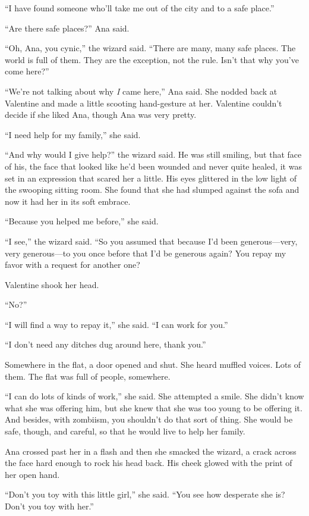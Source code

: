 “I have found someone who’ll take me out of the city and to a safe
place.”

“Are there safe places?” Ana said.

“Oh, Ana, you cynic,” the wizard said. “There are many, many safe
places. The world is full of them. They are the exception, not the
rule. Isn’t that why you’ve come here?”

“We’re not talking about why \emph{I} came here,” Ana said. She
nodded back at Valentine and made a little scooting hand-gesture at
her. Valentine couldn’t decide if she liked Ana, though Ana was
very pretty.

“I need help for my family,” she said.

“And why would I give help?” the wizard said. He was still smiling,
but that face of his, the face that looked like he’d been wounded
and never quite healed, it was set in an expression that scared her
a little. His eyes glittered in the low light of the swooping
sitting room. She found that she had slumped against the sofa and
now it had her in its soft embrace.

“Because you helped me before,” she said.

“I see,” the wizard said. “So you assumed that because I’d been
generous—very, very generous—to you once before that I’d be
generous again? You repay my favor with a request for another one?

Valentine shook her head.

“No?”

“I will find a way to repay it,” she said. “I can work for you.”

“I don’t need any ditches dug around here, thank you.”

Somewhere in the flat, a door opened and shut. She heard muffled
voices. Lots of them. The flat was full of people, somewhere.

“I can do lots of kinds of work,” she said. She attempted a smile.
She didn’t know what she was offering him, but she knew that she
was too young to be offering it. And besides, with zombiism, you
shouldn’t do that sort of thing. She would be safe, though, and
careful, so that he would live to help her family.

Ana crossed past her in a flash and then she smacked the wizard, a
crack across the face hard enough to rock his head back. His cheek
glowed with the print of her open hand.

“Don’t you toy with this little girl,” she said. “You see how
desperate she is? Don’t you toy with her.”

